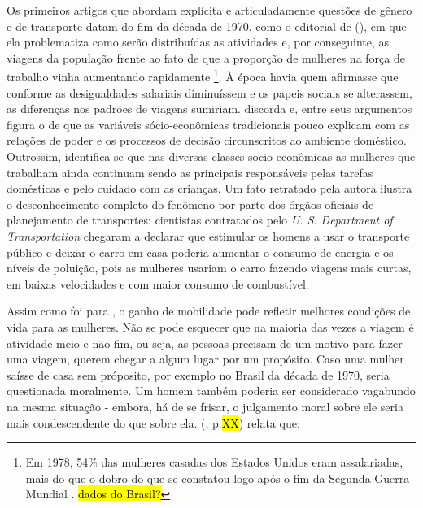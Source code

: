 Os primeiros artigos que abordam explícita e articuladamente questões de gênero e de transporte datam do fim da década de 1970, como o editorial de  (\citeyear{ROSENBLOOM1978}), em que ela problematiza como serão distribuídas as atividades e, por conseguinte, as viagens da população frente ao fato de que a proporção de mulheres na força de trabalho vinha aumentando rapidamente
\footnote{Em 1978, 54\% das mulheres casadas dos Estados Unidos eram assalariadas, mais do que o dobro do que se constatou logo após o fim da Segunda Guerra Mundial \cite{ROSENBLOOM1978}.
\hl{dados do Brasil?}}. À época havia quem afirmasse que conforme as desigualdades salariais diminuíssem e os papeis sociais se alterassem, as diferenças nos padrões de viagens sumiriam.  discorda e, entre seus argumentos figura o de que as variáveis sócio-econômicas tradicionais pouco explicam com as relações de poder e os processos de decisão circunscritos ao ambiente doméstico. Outrossim, identifica-se que nas diversas classes socio-econômicas as mulheres que trabalham ainda continuam sendo as principais responsáveis pelas tarefas domésticas e pelo cuidado com as crianças. Um fato retratado pela autora ilustra o desconhecimento completo do fenômeno por parte dos órgãos oficiais de planejamento de transportes: cientistas contratados pelo \emph{U. S. Department of Transportation} chegaram a declarar que estimular os homens a usar o transporte público e  deixar o carro em casa poderia aumentar o consumo de energia e os níveis de poluição, pois as mulheres usariam o carro fazendo viagens mais curtas, em baixas velocidades e com maior consumo de combustível.


Assim como foi para , o ganho de mobilidade pode refletir melhores condições de vida para as mulheres. Não se pode esquecer que na maioria das vezes a viagem é atividade meio e não fim, ou seja, as pessoas precisam de um motivo para fazer uma viagem, querem chegar a algum lugar por um propósito. Caso uma mulher saísse de casa sem próposito, por exemplo no Brasil da década de 1970, seria questionada moralmente. Um homem também poderia ser considerado vagabundo na mesma situação - embora, há de se frisar, o julgamento moral sobre ele seria mais condescendente do que sobre ela.  (\citeyear{DINCAO2012}, p.\hl{XX}) relata que: 

